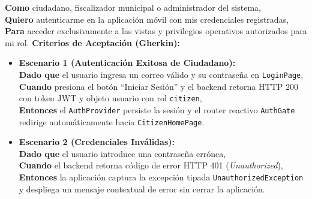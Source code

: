 \documentclass[12pt,a4paper]{article}
\begin{document}
\begin{tcolorbox}[colback=tableHeader,colframe=unsaacBlue,title=\textbf{HU-01: Autenticación por Control de Acceso Basado en Roles (RBAC)}]
\textbf{Como} ciudadano, fiscalizador municipal o administrador del sistema, \\
\textbf{Quiero} autenticarme en la aplicación móvil con mis credenciales registradas, \\
\textbf{Para} acceder exclusivamente a las vistas y privilegios operativos autorizados para mi rol.
\tcblower
\textbf{Criterios de Aceptación (Gherkin):}
\begin{itemize}[leftmargin=*]
    \item \textbf{Escenario 1 (Autenticación Exitosa de Ciudadano):} \\
    \textbf{Dado que} el usuario ingresa un correo válido y su contraseña en \texttt{LoginPage}, \\
    \textbf{Cuando} presiona el botón ``Iniciar Sesión'' y el backend retorna HTTP 200 con token JWT y objeto usuario con rol \texttt{citizen}, \\
    \textbf{Entonces} el \texttt{AuthProvider} persiste la sesión y el router reactivo \texttt{AuthGate} redirige automáticamente hacia \texttt{CitizenHomePage}.
    \item \textbf{Escenario 2 (Credenciales Inválidas):} \\
    \textbf{Dado que} el usuario introduce una contraseña errónea, \\
    \textbf{Cuando} el backend retorna código de error HTTP 401 (\textit{Unauthorized}), \\
    \textbf{Entonces} la aplicación captura la excepción tipada \texttt{UnauthorizedException} y despliega un mensaje contextual de error sin cerrar la aplicación.
\end{itemize}
\end{tcolorbox}
\end{document}
